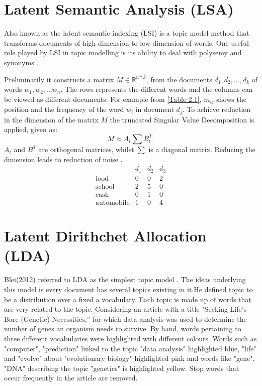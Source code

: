 \section{Latent Semantic Analysis (LSA)}
\begin{flushleft}
Also known as the latent semantic indexing (LSI) is a topic model method
that transforms documents of high dimension to low dimension of words. One useful role played by LSI in topic modelling is its ability to deal with polysemy and synonyms \cite{deerwester1990indexing}.
\end{flushleft} 
Preliminarily it constructs a matrix $M\in \mathbb{R}^{n*k}$, from the documents $d_1, d_2,..., d_k$ of words $w_1, w_2, ... w_n$. The rows represents the different words and the columns can be viewed as different documents.
For example from \eqref{Table 2.1}, $m_{ij}$ shows the position and the frequency of the word $w_i$ in document $d_j$.
To achieve reduction in the dimension of the matrix $M$ the truncated Singular Value Decomposition is applied, given as:
$$M\approx A_t \sum B^{T}_t.$$
$A_t$ and $B^T$ are orthogonal matrices, whilst $ \sum$ is a diagonal matrix.
Reducing the dimension leads to reduction of noise \cite{deerwester1990indexing}.
$$\begin{array}{cccc}
 &d_1 & d_2 &d_3 \\ 
 \text{food} & 0 & 0 & 2 \\ 
 \text{school} & 2 & 5 & 0 \\ 
 \text{cash} & 0 & 1 & 0 \\ 
 \text{automobile} & 1 & 0 & 4
  \end{array} $$
\section{ Latent Dirithchet Allocation (LDA)}
\begin{flushleft}
Blei(2012) referred to LDA as the simplest topic model . The ideas underlying this model is every document has several topics existing in it.He defined topic to be a distribution over a fixed a vocabulary.
Each topic is made up of words that are very related to the topic. Considering an article with a title "Seeking Life’s Bare (Genetic) Necessities,” for which data analysis was used to determine the number of genes an organism needs to survive. By hand, words pertaining to three different vocabularies were highlighted with different colours. Words such as "computer", "prediction" linked to the topic "data analysis" highlighted blue, "life" and "evolve" about "evolutionary biology" highlighted pink and words like "gene", "DNA" describing the topic "genetics" is highlighted yellow.
Stop words that occur frequently in the article are removed. 
\end{flushleft}

